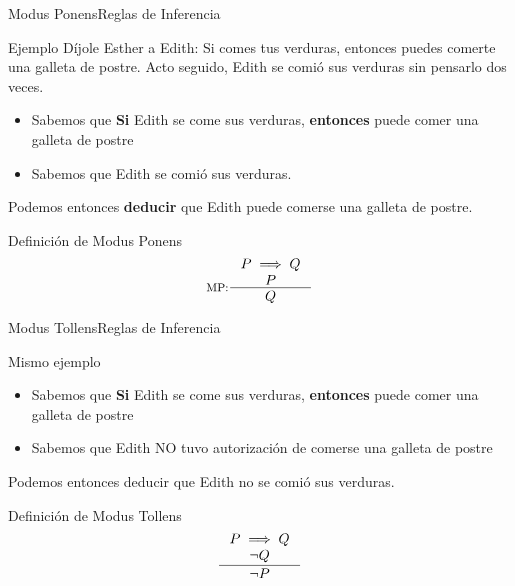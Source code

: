 \documentclass[spanish, c]{beamer}
\begin{document}
\begin{frame}{Modus Ponens}{Reglas de Inferencia}
    \begin{exampleblock}{Ejemplo}
        Díjole Esther a Edith: Si comes tus verduras, entonces puedes comerte una galleta de postre.
        Acto seguido, Edith se comió sus verduras sin pensarlo dos veces.

        \begin{itemize}
            \item Sabemos que \textbf{Si} Edith se come sus verduras, \textbf{entonces} puede comer una galleta de postre
            \item Sabemos que Edith se comió sus verduras.
        \end{itemize}

        Podemos entonces \textbf{deducir} que Edith puede comerse una galleta de postre.
    \end{exampleblock}

    \begin{block}{Definición de Modus Ponens}
            $$\inference[MP:]{P \implies Q \\ P}{Q}$$
    \end{block}
\end{frame}

\begin{frame}{Modus Tollens}{Reglas de Inferencia}

    \begin{exampleblock}{Mismo ejemplo}
        \begin{itemize}
            \item Sabemos que \textbf{Si} Edith se come sus verduras, \textbf{entonces} puede comer una galleta de postre
            \item Sabemos que Edith NO tuvo autorización de comerse una galleta de postre
        \end{itemize}

        Podemos entonces deducir que Edith no se comió sus verduras.
    \end{exampleblock}

    \begin{block}{Definición de Modus Tollens}
        $$\inference{P \implies Q \\ \neg Q}{\neg P}$$
    \end{block}
\end{frame}
\end{document}
